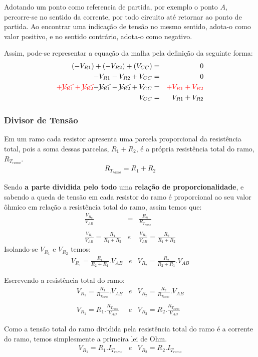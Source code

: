 Adotando um ponto como referencia de partida, por exemplo o ponto $A$, percorre-se no sentido da corrente, por todo circuito até retornar ao ponto de partida. Ao encontrar uma indicação de tensão no mesmo sentido, adota-o como valor positivo, e no sentido contrário, adota-o como negativo.

Assim, pode-se representar a equação da malha pela definição da seguinte forma:
\begin{eqnarray}
	(-V_{R1}) + (-V_{R2}) + (V_{CC})  & = & 0 \\
	-V_{R1} - V_{R2} + V_{CC} & = & 0 \nonumber\\
	\color{red}{ + \cancel{ V_{R1} } + \cancel{ V_{R2} } } \color{black}{- \cancel{V_{R1}} } - \color{black}{\cancel{ V_{R2}} } + V_{CC} & = & \color{red}{+ V_{R1} + V_{R2}} \nonumber\\
	 V_{CC} & = & V_{R1} + V_{R2}
\end{eqnarray}





\subsubsection{Divisor de Tensão}
Em um ramo cada resistor apresenta uma parcela proporcional da resistência total, pois a soma dessas parcelas, $R_1 + R_2$, é a própria resistência total do ramo, $R_{T_{ramo}}$.
\begin{eqnarray}
R_{T_{ramo}} = R_1 + R_2
\end{eqnarray}

Sendo \textbf{a parte dividida pelo todo} uma \textbf{relação de proporcionalidade}, e sabendo a queda de tensão em cada resistor do ramo é proporcional ao seu valor ôhmico em relação a resistência total do ramo, assim temos que:
\begin{eqnarray}
\frac{V_{R_n}}{V_{AB}} & = & \frac{R_n}{R_{T_{ramo}}} \\
\nonumber\\
\frac{V_{R_1}}{V_{AB}} = \frac{R_1}{R_1+R_2} & e &
\frac{V_{R_2}}{V_{AB}} = \frac{R_2}{R_1+R_2}
\end{eqnarray}
Isolando-se $V_{R_1}$  e $V_{R_2}$ temos:
\begin{eqnarray}
V_{R_1} = \frac{R_1}{R_2 + R_1} . V_{AB} & e &
V_{R_2} = \frac{R_2}{R_2 + R_1} . V_{AB}
\end{eqnarray}

Escrevendo a resistência total do ramo:
\begin{eqnarray}
	V_{R_1} = \frac{R_1}{R_{T_{ramo}}} . V_{AB} & e &
	V_{R_2} = \frac{R_2}{R_{T_{ramo}}} . V_{AB} \nonumber\\
	\nonumber\\
	V_{R_1} = R_1.\frac{ R_{T_{ramo}}}{V_{AB}} & e &
	V_{R_2} = R_2.\frac{ R_{T_{ramo}}}{V_{AB}} \nonumber
\end{eqnarray}

Como a tensão total do ramo dividida pela resistência total do ramo é a corrente do ramo, temos simplesmente a primeira lei de Ohm.
\begin{eqnarray}
	V_{R_1} = R_1.I_{T_{ramo}} & e &
	V_{R_2} = R_2.I_{T_{ramo}} \nonumber
\end{eqnarray}
